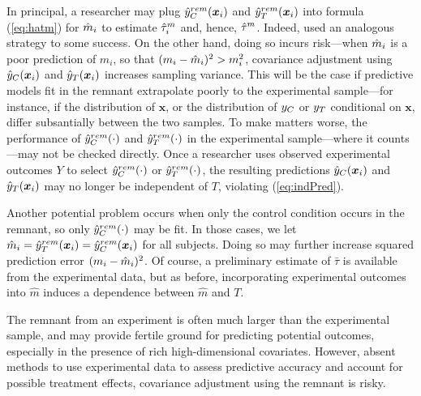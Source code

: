 In principal, a researcher may plug $\hat{y}_C^{rem}(\bm{x}_i)$ and $\hat{y}_T^{rem}(\bm{x}_i)$ into formula
(\ref{eq:hatm}) for $\hat{m}_i$ to estimate $\hat{\tau}_i^m$ and, hence, $\hat{\tau}^m$.
Indeed, \citet{rebarEDM} used an analogous strategy to some success.
On the other hand, doing so incurs risk---when $\hat{m}_i$ is a poor
prediction of $m_i$, so that $(m_i-\hat{m}_i)^2>m_i^2$, covariance
adjustment using $\hat{y}_C(\bm{x}_i)$ and $\hat{y}_T(\bm{x}_i)$ increases sampling variance.
This will be the case if predictive models fit in the remnant
extrapolate poorly to the experimental sample---for instance, if the
distribution of $\bm{x}$, or the distribution of $y_C$ or $y_T$
conditional on $\bm{x}$, differ subsantially between the two samples.
To make matters worse, the performance of $\hat{y}_C^{rem}(\cdot)$ and $\hat{y}_T^{rem}(\cdot)$ in the
experimental sample---where it counts---may not be checked directly.
Once a researcher uses observed experimental outcomes $Y$ to select
$\hat{y}_C^{rem}(\cdot)$ or $\hat{y}_T^{rem}(\cdot)$, the resulting predictions $\hat{y}_C(\bm{x}_i)$ and
$\hat{y}_T(\bm{x}_i)$ may no longer be independent of $T$, violating
(\ref{eq:indPred}).

Another potential problem occurs when only the control condition
occurs in the remnant, so only $\hat{y}_C^{rem}(\cdot)$ may be fit.
In those cases, we let $\hat{m}_i=\hat{y}_T^{rem}(\bm{x}_i)=\hat{y}_C^{rem}(\bm{x}_i)$ for all subjects.
Doing so may further increase squared prediction error $(m_i-\hat{m}_i)^2$.
Of course, a preliminary estimate of $\bar{\tau}$ is available from
the experimental data, but as before, incorporating experimental
outcomes into $\hat{m}$ induces a dependence between $\hat{m}$ and
$T$.

The remnant from an experiment is often much larger than the
experimental sample, and may provide fertile ground for predicting
potential outcomes, especially in the presence of rich
high-dimensional covariates.
However, absent methods to use experimental data to assess predictive
accuracy and account for possible treatment effects, covariance
adjustment using the remnant is risky.